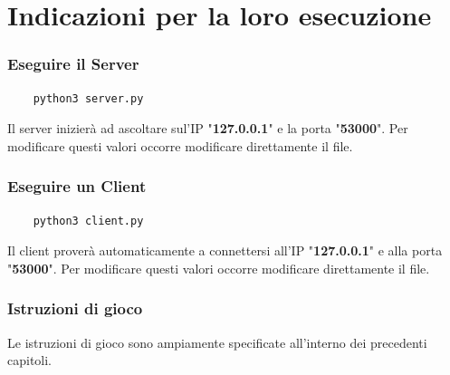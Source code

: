 \documentclass[a4paper,12pt]{report}
\begin{document}
\chapter{Indicazioni per la loro esecuzione}
\subsection{Eseguire il Server}
\begin{verbatim}
	python3 server.py
\end{verbatim}
Il server inizierà ad ascoltare sul'IP "\textbf{127.0.0.1}" e la porta "\textbf{53000}". Per modificare questi valori occorre modificare direttamente il file.
\subsection{Eseguire un Client}
\begin{verbatim}
	python3 client.py
\end{verbatim}
Il client proverà automaticamente a connettersi all'IP "\textbf{127.0.0.1}" e alla porta "\textbf{53000}". Per modificare questi valori occorre modificare direttamente il file.
\subsection{Istruzioni di gioco}
Le istruzioni di gioco sono ampiamente specificate all'interno dei precedenti capitoli.
\end{document}
